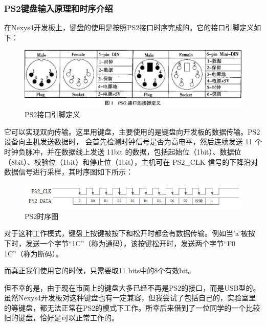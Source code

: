 \documentclass[UTF8]{article}
\begin{document}
	\subsubsection{PS2键盘输入原理和时序介绍}
	在Nexys4开发板上，键盘的使用是按照PS2接口时序完成的。它的接口引脚定义如下：\par
	\begin{figure}[H]
		\centering
		\includegraphics[scale=0.5]{PS2_interface.jpg}
		\caption{PS2接口引脚定义}
		\label{PS2_interface}
	\end{figure}\par
	它可以实现双向传输。这里用键盘，主要使用的是键盘向开发板的数据传输。PS2 设备向主机发送数据时， 会首先检测时钟信号是否为高电平，然后连续发送 11 个时钟负脉冲，并在数据线上发送 11bit 的数据，包括起始位（1bit）、数据位（8bit）、校验位（1bit）和停止位（1bit），主机可在 PS2\_CLK 信号的下降沿对数据信号进行采样，其时序图如下所示：
	\begin{figure}[H]
		\centering
		\includegraphics[scale=0.5]{PS2_sequence_chart.jpg}
		\caption{PS2时序图}
		\label{PS2_sequence_chart}
	\end{figure}\par
	对于这种工作模式，键盘上按键被按下和松开时都会有数据传输。例如当’a’被按下时，发送一个字节“1C”（称为通码），该按键松开时，发送两个字节“F0 1C”（称为断码）。\par
	而真正我们使用它的时候，只需要取11 bits中的8个有效bit。\par
	但不幸的是，由于现在市面上的键盘大多已经不再是PS2的接口，而是USB型的。虽然Nexys4开发板对这种键盘也有一定兼容，但我尝试了包括自己的，实验室里的等键盘，都无法正常在PS2的模式下工作。所幸后来借到了一位同学的一个比较旧的键盘，恰好是可以正常工作的。\par
\end{document}

